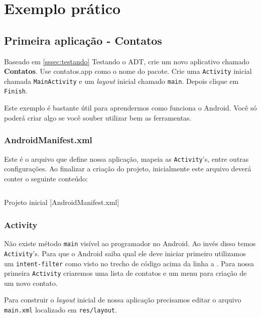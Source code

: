 \chapter{Exemplo prático}

\section{Primeira aplicação - Contatos}

Baseado em \ref{sssec:testando} Testando o ADT, crie um novo aplicativo
chamado \textbf{Contatos}. Use contatos.app como o nome do pacote. Crie
uma \texttt{Activity} inicial chamada \texttt{MainActivity} e um
\emph{layout} inicial chamado \texttt{main}. Depois clique em
\texttt{Finish}.

Este exemplo é bastante útil para aprendermos como funciona o Android.
Você só poderá criar algo se você souber utilizar bem as ferramentas.

\subsection{AndroidManifest.xml}

Este é o arquivo que define nossa aplicação, mapeia as
\texttt{Activity}'s, entre outras configurações. Ao finalizar a criação
do projeto, inicialmente este arquivo deverá conter o seguinte conteúdo:

\begin{listing}[H]
  \inputminted[linenos=true,frame=bottomline,tabsize=3]{ xml }{ source/AndroidManifest-1.xml }
  \caption{Projeto inicial [AndroidManifest.xml]}
\end{listing}

\subsection{Activity \label{ssec:act}}

Não existe método \texttt{main} visível ao programador no Android. Ao
invés disso temos \texttt{Activity}'s. Para que o Android saiba qual ele
deve iniciar primeiro utilizamos um \texttt{intent-filter} como visto no
trecho de código acima da linha  a . Para nossa
primeira \texttt{Activity} criaremos uma lista de contatos e um menu
para criação de um novo contato.

Para construir o \emph{layout} inicial de nossa aplicação precisamos
editar o arquivo \texttt{main.xml} localizado em \texttt{res/layout}.

